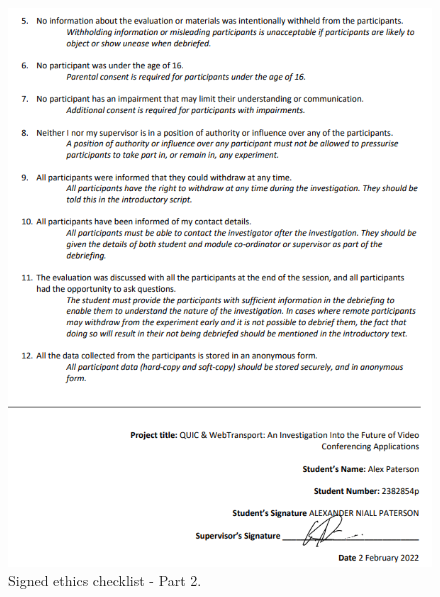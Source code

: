 \documentclass{l4proj}
\begin{document}
\begin{appendices}
\begin{figure}[h]
    \centering
    \includegraphics[width=0.95\linewidth]{images/ethics/checklist-2.png}
	\caption{Signed ethics checklist - Part 2.}
    \label{ethics-2}
\end{figure}


\end{appendices}




% 

% 
\printbibliography
\end{document}
